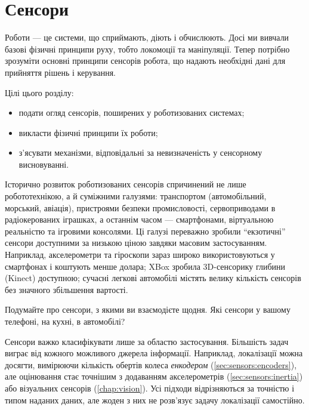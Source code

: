\chapter{Сенсори}\label{chap:sensors}

Роботи — це системи, що сприймають, діють і обчислюють. Досі ми вивчали базові фізичні принципи руху, тобто локомоції та маніпуляції. Тепер потрібно зрозуміти основні принципи сенсорів робота, що надають необхідні дані для прийняття рішень і керування.

Цілі цього розділу:
\begin{itemize}
\item подати огляд сенсорів, поширених у роботизованих системах;
\item викласти фізичні принципи їх роботи;
\item з'ясувати механізми, відповідальні за невизначеність у сенсорному висновуванні.
\end{itemize}

Історично розвиток роботизованих сенсорів спричинений не лише робототехнікою, а й суміжними галузями: транспортом (автомобільний, морський, авіація), пристроями безпеки промисловості, сервоприводами в радіокерованих іграшках, а останнім часом — смартфонами, віртуальною реальністю та ігровими консолями. Ці галузі переважно зробили ``екзотичні'' сенсори доступними за низькою ціною завдяки масовим застосуванням. Наприклад, акселерометри та гіроскопи зараз широко використовуються у смартфонах і коштують менше долара; XBox зробила 3D-сенсорику глибини (Kinect) доступною; сучасні легкові автомобілі містять велику кількість сенсорів без значного збільшення вартості.

\begin{mdframed}
Подумайте про сенсори, з якими ви взаємодієте щодня. Які сенсори у вашому телефоні, на кухні, в автомобілі?
\end{mdframed}

Сенсори важко класифікувати лише за областю застосування. Більшість задач виграє від кожного можливого джерела інформації. Наприклад, локалізації можна досягти, вимірюючи кількість обертів колеса \emph{енкодером} (\ref{sec:sensors:encoders}), але оцінювання стає точнішим з додаванням акселерометрів (\cref{sec:sensors:inertia}) або візуальних сенсорів (\cref{chap:vision}). Усі підходи відрізняються за точністю і типом наданих даних, але жоден з них не розв'язує задачу локалізації самостійно.

